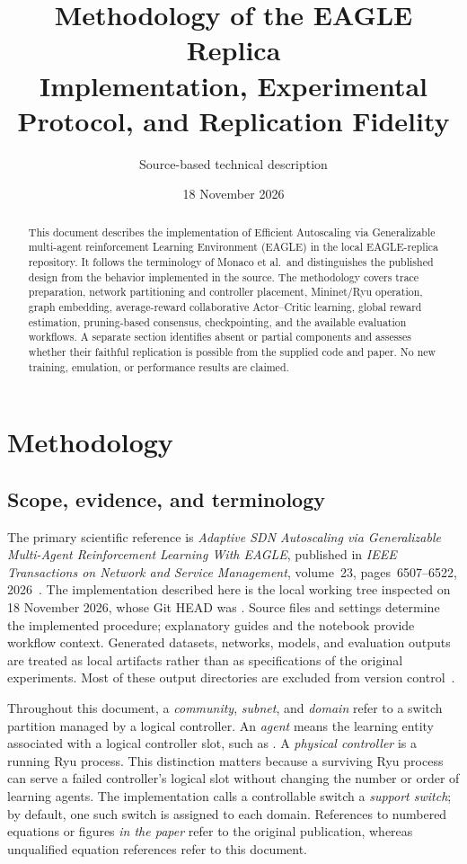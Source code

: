 \documentclass[11pt,a4paper]{article}
\title{Methodology of the EAGLE Replica\\
\large Implementation, Experimental Protocol, and Replication Fidelity}
\author{Source-based technical description}
\date{18 November 2026}
\newcommand{\code}[1]{\texttt{\detokenize{#1}}}
\begin{document}
\maketitle

\begin{abstract}
This document describes the implementation of Efficient Autoscaling via
Generalizable multi-agent reinforcement Learning Environment (EAGLE) in the
local EAGLE-replica repository. It follows the terminology of Monaco et al.\ and
distinguishes the published design from the behavior implemented in the source.
The methodology covers trace preparation, network partitioning and controller
placement, Mininet/Ryu operation, graph embedding, average-reward collaborative
Actor--Critic learning, global reward estimation, pruning-based consensus,
checkpointing, and the available evaluation workflows. A separate section
identifies absent or partial components and assesses whether their faithful
replication is possible from the supplied code and paper. No new training,
emulation, or performance results are claimed.
\end{abstract}

\tableofcontents
\newpage

\section{Methodology}
\label{sec:methodology}

\subsection{Scope, evidence, and terminology}
\label{sec:scope}

The primary scientific reference is \emph{Adaptive SDN Autoscaling via
Generalizable Multi-Agent Reinforcement Learning With EAGLE}, published in
\emph{IEEE Transactions on Network and Service Management}, volume~23,
pages~6507--6522, 2026~\cite{paper}. The implementation described here is the local
working tree inspected on 18 November 2026, whose Git HEAD was
\code{37699c8af206e1a2daf3faae37e085efbaa9e5f7}. Source files and settings determine
the implemented procedure; explanatory guides and the notebook provide
workflow context. Generated datasets, networks, models, and evaluation outputs
are treated as local artifacts rather than as specifications of the original
experiments. Most of these output directories are excluded from version
control~\cite{code-snapshot}.

Throughout this document, a \emph{community}, \emph{subnet}, and \emph{domain}
refer to a switch partition managed by a logical controller. An \emph{agent}
means the learning entity associated with a logical controller slot, such as
\code{c0}. A \emph{physical controller} is a running Ryu process. This distinction
matters because a surviving Ryu process can serve a failed controller's logical
slot without changing the number or order of learning agents. The implementation
calls a controllable switch a \emph{support switch}; by default, one such switch
is assigned to each domain. References to numbered equations or figures
\emph{in the paper} refer to the original publication, whereas unqualified
equation references refer to this document.
\end{document}
